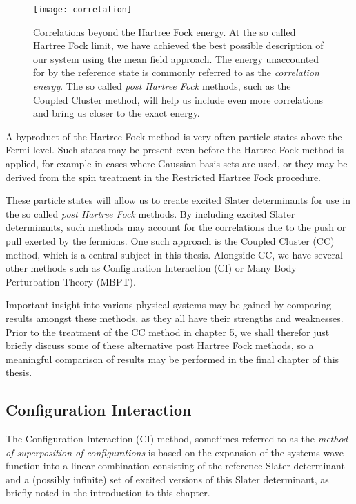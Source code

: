\begin{figure}[p]
    \centering
    \texttt{[image: correlation]}
    \caption{Correlations beyond the Hartree Fock energy. At the so called Hartree Fock limit, we have achieved the best possible description of our system using the mean field approach. The energy unaccounted for by the reference state is commonly referred to as the \emph{correlation energy}. The so called \emph{post Hartree Fock} methods, such as the Coupled Cluster method, will help us include even more correlations and bring us closer to the exact energy.}
    \label{fig:correlation}
\end{figure}


A byproduct of the Hartree Fock method is very often particle states above the Fermi level. Such states may be present even before the Hartree Fock method is applied, for example in cases where Gaussian basis sets are used, or they may be derived from the spin treatment in the Restricted Hartree Fock procedure.

These particle states will allow us to create excited Slater determinants for use in the so called \emph{post Hartree Fock} methods. By including excited Slater determinants, such methods may account for the correlations due to the push or pull exerted by the fermions. One such approach is the Coupled Cluster (CC) method, which is a central subject in this thesis. Alongside CC, we have several other methods such as Configuration Interaction (CI) or Many Body Perturbation Theory (MBPT). 

Important insight into various physical systems may be gained by comparing results amongst these methods, as they all have their strengths and weaknesses. Prior to the treatment of the CC method in chapter 5, we shall therefor just briefly discuss some of these alternative post Hartree Fock methods, so a meaningful comparison of results may be performed in the final chapter of this thesis.

\subsection{Configuration Interaction}

The Configuration Interaction (CI) method, sometimes referred to as the \emph{method of superposition of configurations} \cite{Harris} is based on the expansion of the systems wave function into a linear combination consisting of the reference Slater determinant and a (possibly infinite) set of excited versions of this Slater determinant, as briefly noted in the introduction to this chapter.

